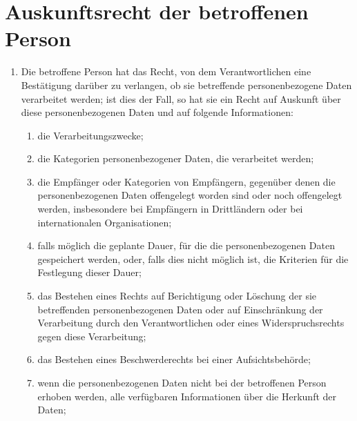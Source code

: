 \chapter{Auskunftsrecht der betroffenen Person}
\label{ch:15}


\begin{enumerate}

  \item Die betroffene Person hat das Recht, von dem Verantwortlichen eine Bestätigung darüber zu verlangen, ob sie
   betreffende personenbezogene Daten verarbeitet werden; ist dies der Fall, so hat sie ein Recht auf Auskunft über
   diese personenbezogenen Daten und auf folgende Informationen:
  \label{itm:15-1}

  \begin{enumerate}
  
    \item die Verarbeitungszwecke;
    \label{itm:15-1a}

    \item die Kategorien personenbezogener Daten, die verarbeitet werden;
    \label{itm:15-1b}

    \item die Empfänger oder Kategorien von Empfängern, gegenüber denen die personenbezogenen Daten offengelegt worden
     sind oder noch offengelegt werden, insbesondere bei Empfängern in Drittländern oder bei internationalen
     Organisationen;
    \label{itm:15-1c}

    \item falls möglich die geplante Dauer, für die die personenbezogenen Daten gespeichert werden, oder, falls dies
     nicht möglich ist, die Kriterien für die Festlegung dieser Dauer;
    \label{itm:15-1d}

    \item das Bestehen eines Rechts auf Berichtigung oder Löschung der sie betreffenden personenbezogenen Daten oder auf
     Einschränkung der Verarbeitung durch den Verantwortlichen oder eines Widerspruchsrechts gegen diese Verarbeitung;
    \label{itm:15-1e}

    \item das Bestehen eines Beschwerderechts bei einer Aufsichtsbehörde;
    \label{itm:15-1f}

    \item wenn die personenbezogenen Daten nicht bei der betroffenen Person erhoben werden, alle verfügbaren
     Informationen über die Herkunft der Daten;
    \label{itm:15-1g}


\end{enumerate}
\end{enumerate}
